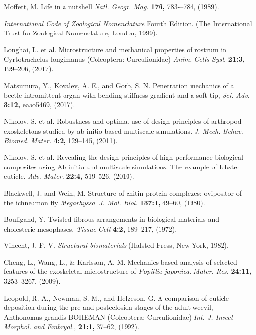 \documentclass[twocolumn, linenumbers, superscriptaddress, nofootinbib]{revtex4-1}
\begin{document}
\begin{thebibliography}{50}
				Moffett, M.
				Life in a nutshell
				\textit{Natl. Geogr. Mag.}
				\textbf{176,}
				783-–784,
				(1989).
			
				\textit{International Code of Zoological Nomenclature}
				Fourth Edition. 
				(The International Trust for Zoological Nomenclature,
				London,
				1999).
			
				Longhai, L. et al.
				Microstructure and mechanical properties of rostrum in Cyrtotrachelus longimanus (Coleoptera: Curculionidae)
				\textit{Anim. Cells Syst.}
				\textbf{21:3,}
				199--206,
				(2017).
			
				Matsumura, Y., Kovalev, A. E., and Gorb, S. N.
				Penetration mechanics of a beetle intromittent organ with bending stiffness gradient and a soft tip,
				\textit{Sci. Adv.}
				\textbf{3:12,}
				eaao5469,
				(2017).
				
				Nikolov, S. et al.
				Robustness and optimal use of design principles of arthropod exoskeletons studied by ab initio-based multiscale simulations.
				\textit{J. Mech. Behav. Biomed. Mater.}
				\textbf{4:2,}
				129--145,
				(2011).
			
				Nikolov, S. et al.
				Revealing the design principles of high-performance biological composites using Ab initio and multiscale simulations: The example of lobster cuticle.
				\textit{Adv. Mater.}
				\textbf{22:4,}
				519--526,
				(2010).
			
				Blackwell, J. and Weih, M.
				Structure of chitin-protein complexes: ovipositor of the ichneumon fly \textit{Megarhyssa}.
				\textit{J. Mol. Biol.}
				\textbf{137:1,}
				49--60,
				(1980).
			
				Bouligand, Y.
				Twisted fibrous arrangements in biological materials and cholesteric mesophases.
				\textit{Tissue Cell}
				\textbf{4:2,}
				189--217,
				(1972).
			
				Vincent, J. F. V.
				\textit{Structural biomaterials}
				(Halsted Press,
				New York,
				1982).
			
				Cheng, L., Wang, L., \& Karlsson, A. M.
				Mechanics-based analysis of selected features of the exoskeletal microstructure of \textit{Popillia japonica}.
				\textit{Mater. Res.}
				\textbf{24:11,}
				3253--3267,
				(2009).			
			
				Leopold, R. A., Newman, S. M., and Helgeson, G.
				A comparison of cuticle deposition during the pre-and posteclosion stages of the adult weevil, Anthonomus grandis BOHEMAN (Coleoptera: Curculionidae)
				\textit{Int. J. Insect Morphol. and Embryol.},
				\textbf{21:1,}
				37--62,
				(1992).
			

\end{thebibliography}
\end{document}
